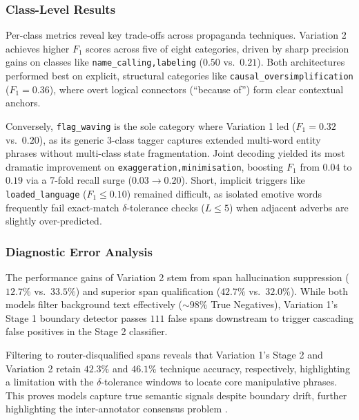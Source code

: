 \documentclass[12pt, a4paper]{article}
\begin{document}
\subsubsection{Class-Level Results}
\label{subsubsec:task2_class_level_results}

Per-class metrics reveal key trade-offs across propaganda techniques. Variation 2 achieves higher $F_1$ scores across five of eight categories, driven by sharp precision gains on classes like \texttt{name\_calling,labeling} ($0.50$ vs.\ $0.21$). Both architectures performed best on explicit, structural categories like \texttt{causal\_oversimplification} ($F_1 = 0.36$), where overt logical connectors (``because of'') form clear contextual anchors.

Conversely, \texttt{flag\_waving} is the sole category where Variation 1 led ($F_1 = 0.32$ vs.\ $0.20$), as its generic 3-class tagger captures extended multi-word entity phrases without multi-class state fragmentation. Joint decoding yielded its most dramatic improvement on \texttt{exaggeration,minimisation}, boosting $F_1$ from $0.04$ to $0.19$ via a 7-fold recall surge ($0.03 \rightarrow 0.20$). Short, implicit triggers like \texttt{loaded\_language} ($F_1 \le 0.10$) remained difficult, as isolated emotive words frequently fail exact-match $\delta$-tolerance checks ($L \le 5$) when adjacent adverbs are slightly over-predicted.

\subsubsection{Diagnostic Error Analysis}
\label{subsubsec:task2_diagnostic_error_results}

The performance gains of Variation 2 stem from span hallucination suppression ($12.7\%$ vs.\ $33.5\%$) and superior span qualification ($42.7\%$ vs.\ $32.0\%$). While both models filter background text effectively ($\sim 98\%$ True Negatives), Variation 1's Stage 1 boundary detector passes $111$ false spans downstream to trigger cascading false positives in the Stage 2 classifier.

Filtering to router-disqualified spans reveals that Variation 1's Stage 2 and Variation 2 retain $42.3\%$ and $46.1\%$ technique accuracy, respectively, highlighting a limitation with the $\delta$-tolerance windows to locate core manipulative phrases. This proves models capture true semantic signals despite boundary drift, further highlighting the inter-annotator consensus problem \cite{dasan2019}.
\end{document}
